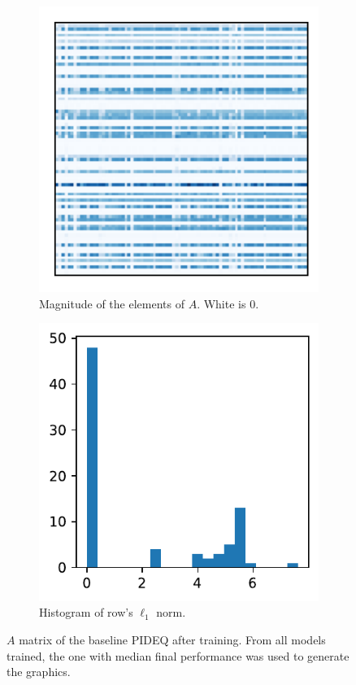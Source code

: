 \begin{figure}[h]
    \centering
    \begin{subfigure}[t]{.45\textwidth}
	\vspace{0pt}\includegraphics{images/exp_1_matplot.pdf}
	\caption{Magnitude of the elements of $A$. White is 0.}
    \end{subfigure}
    \begin{subfigure}[t]{.45\textwidth}
	\vspace{0pt}\includegraphics{images/exp_1_hist.pdf}
	\caption{Histogram of row's $\ell_1$ norm.}
    \end{subfigure}
    \caption{$A$ matrix of the baseline \gls{PIDEQ} after training. From all models trained, the one with median final performance was used to generate the graphics.}
    \label{fig:baseline-pideq-A}
\end{figure}


